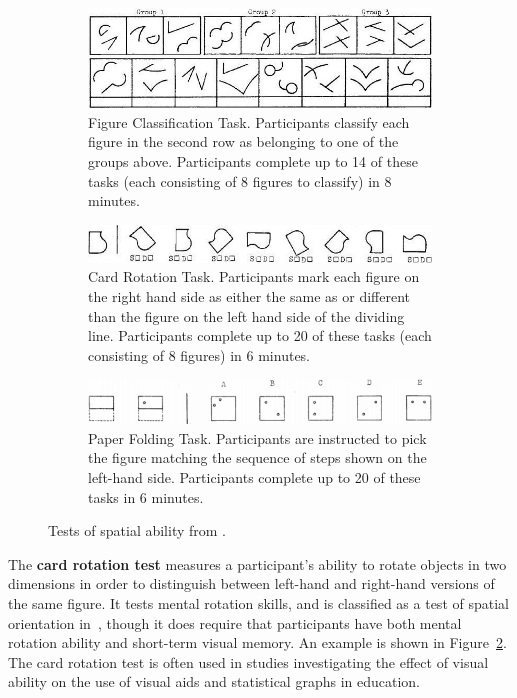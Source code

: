 \documentclass[11pt]{isuthesis}\usepackage[]{graphicx}\usepackage[]{color}
\begin{document}
\begin{figure}[ht]
  \centering
  \begin{subfigure}[b]{.75\linewidth}
  \includegraphics[width=\linewidth]{figureclassification}
  \caption{Figure Classification Task. Participants classify each figure in the second row as belonging to one of the groups above. Participants complete up to 14 of these tasks (each consisting of 8 figures to classify) in 8 minutes.\label{fig:figureclassification}}
  \end{subfigure}
  \begin{subfigure}[b]{.75\linewidth}
  \includegraphics[width=\linewidth]{cardrotation}
  \caption{Card Rotation Task. Participants mark each figure on the right hand side as either the same as or different than the figure on the left hand side of the dividing line. Participants complete up to 20 of these tasks (each consisting of 8 figures) in 6 minutes.\label{fig:cardrotation}}
  \end{subfigure}
  \begin{subfigure}[b]{.75\linewidth}
  \includegraphics[width=\linewidth]{paperfolding}
  \caption{Paper Folding Task. Participants are instructed to pick the figure matching the sequence of steps shown on the left-hand side. Participants  complete up to 20 of these tasks in 6 minutes.\label{fig:paperfolding}}
  \end{subfigure}
  \caption[Tests of spatial ability]{Tests of spatial ability from \protect\citet{ekstrom1976manual}.}   \label{fig:tests}
\end{figure}
  
The \textbf{card rotation test} measures a participant's ability to rotate objects in two dimensions in order to distinguish between left-hand and right-hand versions of the same figure. It tests mental rotation skills, and is classified as a test of spatial orientation in~\citep{ekstrom1976manual}, though it does require that participants have both mental rotation ability and short-term visual memory. An example is shown in Figure~\ref{fig:cardrotation}. 
The card rotation test is often used in studies investigating the effect of visual ability on the use of visual aids \citep{mayer1994whom} and statistical graphs \citep{lowrie2007solving} in education.
\end{document}
